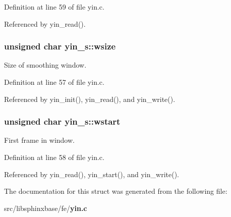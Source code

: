 Definition at line 59 of file yin.\-c.



Referenced by yin\-\_\-read().

\subsubsection[{wsize}]{\setlength{\rightskip}{0pt plus 5cm}unsigned char yin\-\_\-s\-::wsize}\label{structyin__s_a024d8e9d70f94a7f62457154fb5a4b03}


Size of smoothing window. 



Definition at line 57 of file yin.\-c.



Referenced by yin\-\_\-init(), yin\-\_\-read(), and yin\-\_\-write().

\subsubsection[{wstart}]{\setlength{\rightskip}{0pt plus 5cm}unsigned char yin\-\_\-s\-::wstart}\label{structyin__s_a18481851da6db4df2a469b80c2c5704e}


First frame in window. 



Definition at line 58 of file yin.\-c.



Referenced by yin\-\_\-read(), yin\-\_\-start(), and yin\-\_\-write().



The documentation for this struct was generated from the following file\-:\begin{DoxyCompactItemize}
\item 
src/libsphinxbase/fe/{\bf yin.\-c}\end{DoxyCompactItemize}
